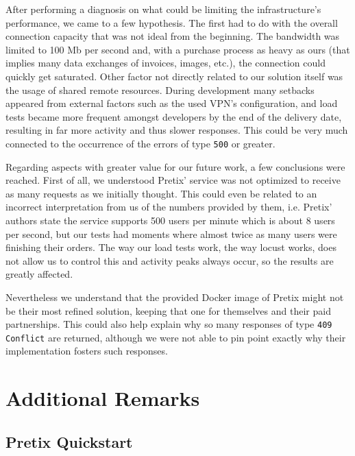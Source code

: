 \documentclass[12pt]{article}
\begin{document}
After performing a diagnosis on what could be limiting the infrastructure's performance, we came to a few hypothesis.
The first had to do with the overall connection capacity that was not ideal from the beginning. 
The bandwidth was limited to 100 Mb per second and, with a purchase process as heavy as ours (that implies many data exchanges of invoices, images, etc.), the 
connection could quickly get saturated.
Other factor not directly related to our solution itself was the usage of shared remote resources.
During development many setbacks appeared from external factors such as the used VPN's configuration, and load tests became more frequent amongst developers by 
the end of the delivery date, resulting in far more activity and thus slower responses.
This could be very much connected to the occurrence of the errors of type \texttt{500} or greater. 

Regarding aspects with greater value for our future work, a few conclusions were reached.
First of all, we understood Pretix' service was not optimized to receive as many requests as we initially thought.
This could even be related to an incorrect interpretation from us of the numbers provided by them, i.e. Pretix' authors state the service supports 500 users per 
minute which is about 8 users per second, but our tests had moments where almost twice as many users were finishing their orders.
The way our load tests work, the way locust works, does not allow us to control this and activity peaks always occur, so the results are greatly affected.

Nevertheless we understand that the provided Docker image of Pretix might not be their most refined solution, keeping that one for themselves and their paid 
partnerships.
This could also help explain why so many responses of type \texttt{409 Conflict} are returned, although we were not able to pin point exactly why their 
implementation fosters such responses. 

\newpage
\section{Additional Remarks} \label{remarks} %

\subsection{Pretix Quickstart} \label{remarks.quickstart} %
\end{document}
